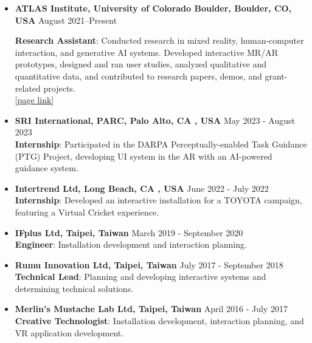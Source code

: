 \begin{itemize}

\item \textbf{ATLAS Institute, University of Colorado Boulder, Boulder, CO, USA}
\hfill August 2021--Present 

\textbf{Research Assistant}: Conducted research in mixed reality, human-computer interaction, and generative AI systems. Developed interactive MR/AR prototypes, designed and ran user studies, analyzed qualitative and quantitative data, and contributed to research papers, demos, and grant-related projects. \\ \href{https://www.colorado.edu/atlas/suibi-che-chuan-weng}{[page link]}
    \item \textbf{SRI International, PARC, Palo Alto, CA , USA} \hfill May 2023 - August 2023
    \\
    \textbf{Internship}: Participated in the DARPA Perceptually-enabled Task Guidance (PTG) Project, developing UI system in the AR with an AI-powered guidance system. 
    \item \textbf{Intertrend Ltd, Long Beach, CA , USA} \hfill June 2022 - July 2022
    \\
    \textbf{Internship}:
    Developed an interactive installation for a TOYOTA campaign, featuring a Virtual Cricket experience.

    
\item \textbf{IFplus Ltd, Taipei, Taiwan} \hfill March 2019 - September 2020
\\
\textbf{Engineer}: Installation development and interaction planning.

\item \textbf{Rumu Innovation Ltd, Taipei, Taiwan} \hfill July 2017 - September 2018
\\
\textbf{Technical Lead}: Planning and developing interactive systems and determining technical solutions.

\item \textbf{Merlin's Mustache Lab Ltd, Taipei, Taiwan} \hfill April 2016 - July 2017
\\
\textbf{Creative Technologist}: Installation development, interaction planning, and VR application development.

\end{itemize}
